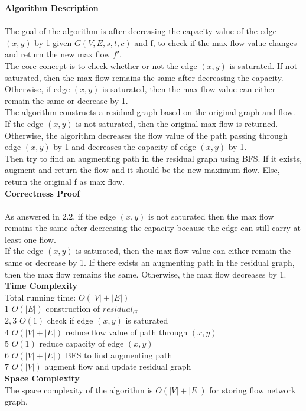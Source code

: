 \documentclass[11pt]{exam}
\begin{document}
\noindent\textbf{Algorithm Description} \\
\\
\indent The goal of the algorithm is after decreasing the capacity value of the edge $(x,y)$ by 1 given $G(V,E,s,t,c)$ and f, to check if the max flow value changes and return the new max flow $f'$.\\
\indent The core concept is to check whether or not the edge $(x,y)$ is saturated. If not saturated, then the max flow remains the same after decreasing the capacity. 
Otherwise, if edge $(x,y)$ is saturated, then the max flow value can either remain the same or decrease by 1.\\
\indent The algorithm constructs a residual graph based on the original graph and flow. If the edge $(x,y)$ is not saturated, then the original max flow is returned. Otherwise, the algorithm decreases the flow value of the path passing through edge $(x,y)$ by 1 and decreases the capacity of edge $(x,y)$ by 1.\\
\indent Then try to find an augmenting path in the residual graph using BFS. If it exists, augment and return the flow and it should be the new maximum flow. Else, return the original f as max flow.\\

\noindent \textbf{Correctness Proof}\\
\\
\indent As answered in 2.2, if the edge $(x,y)$ is not saturated then the max flow remains the same after decreasing the capacity because the edge can still carry at least one flow.\\
\indent If the edge $(x,y)$ is saturated, then the max flow value can either remain the same or decrease by 1. If there exists an augmenting path in the residual graph, then the max flow remains the same. Otherwise, the max flow decreases by 1.\\

\noindent \textbf{Time Complexity}\\
Total running time: $O(|V|+|E|)$\\
$1$  \indent $O(|E|)$ construction of $residual_G$\\
$2,3$ \indent $O(1)$ check if edge $(x,y)$ is saturated\\
$4$  \indent $O(|V|+|E|)$ reduce flow value of path through $(x,y)$\\
$5$  \indent $O(1)$ reduce capacity of edge $(x,y)$\\
$6$  \indent $O(|V|+|E|)$ BFS to find augmenting path\\
$7$  \indent $O(|V|)$ augment flow and update residual graph\\

\noindent \textbf{Space Complexity}\\
The space complexity of the algorithm is $O(|V|+|E|)$ for storing flow network graph.
\end{document}
